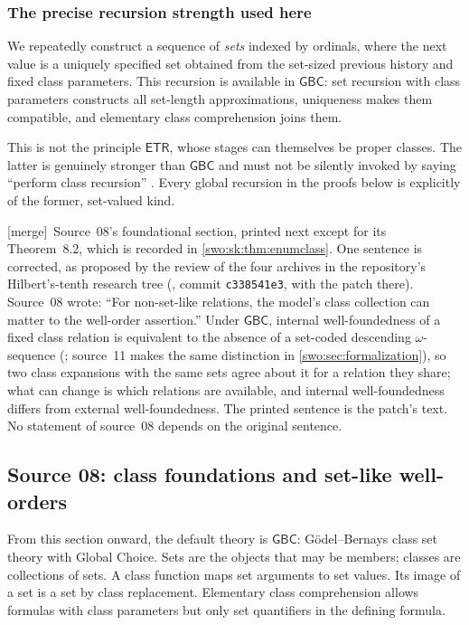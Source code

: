 \documentclass[11pt]{article}
\theoremstyle{definition}
\theoremstyle{remark}
\newcommand{\GBC}{\mathsf{GBC}}
\newcommand{\ETR}{\mathsf{ETR}}
\newcommand{\code}[1]{\texttt{\small #1}}
\newcommand{\merge}{\textsf{[merge]}}
\begin{document}
\subsubsection{The precise recursion strength used here}
We repeatedly construct a sequence of \emph{sets} indexed by ordinals,
where the next value is a uniquely specified set obtained from the
set-sized previous history and fixed class parameters. This recursion
is available in $\GBC$: set recursion with class parameters constructs
all set-length approximations, uniqueness makes them compatible, and
elementary class comprehension joins them.

This is not the principle $\ETR$, whose stages can themselves be proper
classes. The latter is genuinely stronger than $\GBC$ and must not be
silently invoked by saying ``perform class recursion''
\cite[\S2]{GHHSW}. Every global recursion in the proofs below is explicitly
of the former, set-valued kind.


\merge\ Source~08's foundational section, printed next except for its
Theorem~8.2, which is recorded in \cref{swo:sk:thm:enumclass}. One sentence
is corrected, as proposed by the review of the four archives in the
repository's Hilbert's-tenth research tree
(,
commit \code{c338541e3}, with the patch
 there). Source~08 wrote: ``For
non-set-like relations, the model's class collection can matter to the
well-order assertion.'' Under $\GBC$, internal well-foundedness of a fixed
class relation is equivalent to the absence of a set-coded descending
$\omega$-sequence (\cite[Section~3]{HamkinsWoodin}; source~11 makes the same
distinction in \cref{swo:sec:formalization}), so two class expansions with the
same sets agree about it for a relation they share; what can change is which
relations are available, and internal well-foundedness differs from external
well-foundedness. The printed sentence is the patch's text. No statement of
source~08 depends on the original sentence.

\subsection{Source 08: class foundations and set-like well-orders}\label{swo:sk:sec:foundations}

From this section onward, the default theory is $\GBC$: G\"odel--Bernays
class set theory with Global Choice. Sets are the objects that may be
members; classes are collections of sets. A class function maps set
arguments to set values. Its image of a set is a set by class
replacement. Elementary class comprehension allows formulas with
class parameters but only set quantifiers in the defining formula.
\end{document}
